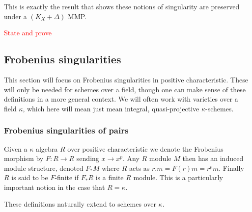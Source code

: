 \documentclass[a4paper,12pt]{book}
\newcommand\myworries[1]{\textcolor{red}{#1}}
\begin{document}
This is exactly the result that shows these notions of singularity are preserved under a $(K_{X}+\Delta)$ MMP.

\myworries{State and prove}

%	

\subsection{Frobenius singularities}

This section will focus on Frobenius singularities in positive characteristic. These will only be needed for schemes over a field, though one can make sense of these definitions in a more general context. We will often work with varieties over a field $\kappa$, which here will mean just mean integral, quasi-projective $\kappa$-schemes.

\subsubsection{Frobenius singularities of pairs}

\begin{definition}
Given a $\kappa$ algebra $R$ over positive characteristic we denote the Frobenius morphism by $F:R\to R$ sending $x \to x^{p}$. Any $R$ module $M$ then has an induced module structure, denoted $F_{*}M$ where $R$ acts as $r.m=F(r)m=r^{p}m$. Finally $R$ is said to be $F$-finite if $F_{*}R$ is a finite $R$ module. This is a particularly important notion in the case that $R=\kappa$.

These definitions naturally extend to schemes over $\kappa$. 
\end{definition}
\end{document}
